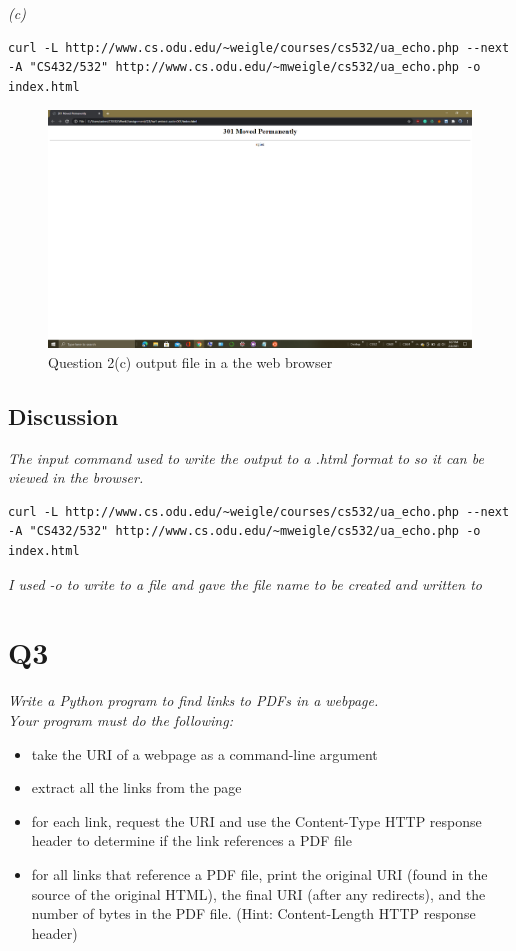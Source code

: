 \documentclass[12pt]{article}
\begin{document}
\emph{(c)}
\begin{lstlisting}
curl -L http://www.cs.odu.edu/~weigle/courses/cs532/ua_echo.php --next -A "CS432/532" http://www.cs.odu.edu/~mweigle/cs532/ua_echo.php -o index.html
\end{lstlisting}
\begin{figure}[H]
    \centering
    \includegraphics[trim=0 0 0 0, clip, width=\textwidth] {Q2c.png}
    \caption{Question 2(c) output file in a the web browser }
    \label{fig:output file}
\end{figure}
\subsection*{Discussion}
\emph{The input command used to write the output to a .html format to so it can be viewed in the browser. }
\begin{lstlisting}
curl -L http://www.cs.odu.edu/~weigle/courses/cs532/ua_echo.php --next -A "CS432/532" http://www.cs.odu.edu/~mweigle/cs532/ua_echo.php -o index.html
\end{lstlisting}
\emph{I used -o to write to a file and gave the file name to be created and written to}



\section*{Q3}
\emph{Write a Python program to find links to PDFs in a webpage.\\Your program must do the following:}
\begin{itemize}
    \item take the URI of a webpage as a command-line argument
    \item extract all the links from the page
    \item for each link, request the URI and use the Content-Type HTTP response header to determine if the link references a PDF file
    \item for all links that reference a PDF file, print the original URI (found in the source of the original HTML), the final URI (after any redirects), and the number of bytes in the PDF file. (Hint: Content-Length HTTP response header)
\end{itemize}
\end{document}
